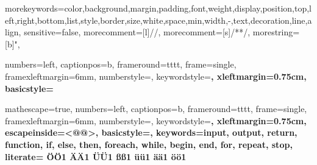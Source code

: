 

{morekeywords={color,background,margin,padding,font,weight,display,position,top,left,right,bottom,list,style,border,size,white,space,min,width,-,text,decoration,line,align},
sensitive=false,
morecomment=[l]{//},
morecomment=[s]{/*}{*/},
morestring=[b]",
}

 {
numbers=left,
captionpos=b,
frameround=tttt,
frame=single,
framexleftmargin=6mm,
numberstyle=\tiny,
keywordstyle=\ttfamily\bfseries,
xleftmargin=0.75cm,
basicstyle=\ttfamily
}

 {
mathescape=true,
numbers=left,
captionpos=b,
frameround=tttt,
frame=single,
framexleftmargin=6mm,
numberstyle=\tiny,
keywordstyle=\ttfamily\bfseries,
xleftmargin=0.75cm,
escapeinside={<@}{@>},
basicstyle=\ttfamily,
keywords={input, output, return, function, if, else, then, foreach, while, begin, end, for, repeat, stop},
literate=%
  {Ö}{{\"O}}1
  {Ä}{{\"A}}1
  {Ü}{{\"U}}1
  {ß}{{\ss}}1
  {ü}{{\"u}}1
  {ä}{{\"a}}1
  {ö}{{\"o}}1
}